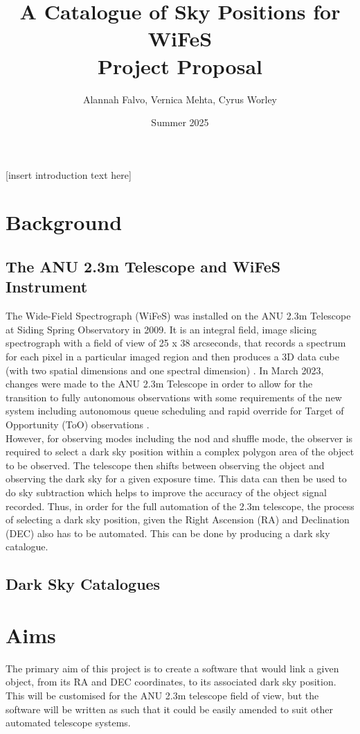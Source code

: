 \documentclass[11pt]{article}
\title{%
    \huge A Catalogue of Sky Positions for WiFeS \\
    \Large \textbf{Project Proposal}}
\author{Alannah Falvo, Vernica Mehta, Cyrus Worley}
\date{Summer 2025}
\begin{document}
\maketitle

[insert introduction text here] \\

\section{Background}
\subsection{The ANU 2.3m Telescope and WiFeS Instrument}
The Wide-Field Spectrograph (WiFeS) was installed on the ANU 2.3m Telescope at Siding Spring Observatory in 2009. It is an integral field, image slicing spectrograph with a field of view of 25 x 38 arcseconds, that records a spectrum for each pixel in a particular imaged region and then produces a 3D data cube (with two spatial dimensions and one spectral dimension) \cite{dopita_wide_2007}.  In March 2023, changes were made to the ANU 2.3m Telescope in order to allow for the transition to fully autonomous observations with some requirements of the new system including autonomous queue scheduling and rapid override for Target of Opportunity (ToO) observations \cite{price_converting_2024}. \\

However, for observing modes including the nod and shuffle mode, the observer is required to select a dark sky position within a complex polygon area of the object to be observed. The telescope then shifts between observing the object and observing the dark sky for a given exposure time. This data can then be used to do sky subtraction which helps to improve the accuracy of the object signal recorded. Thus, in order for the full automation of the 2.3m telescope, the process of selecting a dark sky position, given the Right Ascension (RA) and Declination (DEC) also has to be automated. This can be done by producing a dark sky catalogue. 
\subsection{Dark Sky Catalogues}

\section{Aims}
The primary aim of this project is to create a software that would link a given object, from its RA and DEC coordinates, to its associated dark sky position. This will be customised for the ANU 2.3m telescope field of view, but the software will be written as such that it could be easily amended to suit other automated telescope systems. \\
\end{document}
